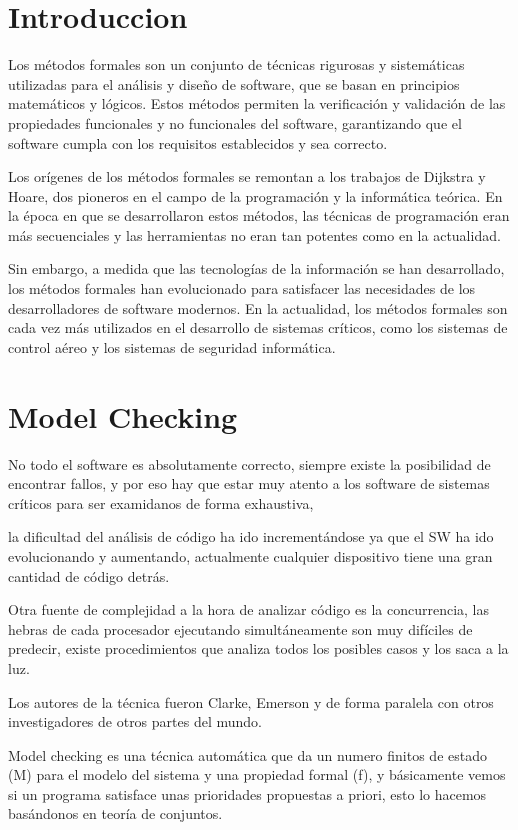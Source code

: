 \section{Introduccion}

Los métodos formales son un conjunto de técnicas rigurosas y sistemáticas utilizadas para el análisis y diseño de software, que se basan en principios matemáticos y lógicos. Estos métodos permiten la verificación y validación de las propiedades funcionales y no funcionales del software, garantizando que el software cumpla con los requisitos establecidos y sea correcto.

Los orígenes de los métodos formales se remontan a los trabajos de Dijkstra y Hoare, dos pioneros en el campo de la programación y la informática teórica. En la época en que se desarrollaron estos métodos, las técnicas de programación eran más secuenciales y las herramientas no eran tan potentes como en la actualidad.

Sin embargo, a medida que las tecnologías de la información se han desarrollado, los métodos formales han evolucionado para satisfacer las necesidades de los desarrolladores de software modernos. En la actualidad, los métodos formales son cada vez más utilizados en el desarrollo de sistemas críticos, como los sistemas de control aéreo y los sistemas de seguridad informática. 

\section{Model Checking}

No todo el software es absolutamente correcto, siempre existe la posibilidad de 
encontrar fallos, y por eso hay que estar muy atento a los software de sistemas 
críticos para ser examidanos de forma exhaustiva,

la dificultad del análisis de código ha ido incrementándose ya que el SW ha ido 
evolucionando y aumentando, actualmente cualquier dispositivo tiene una gran 
cantidad de código detrás.

Otra fuente de complejidad a la hora de analizar código es la concurrencia, 
las hebras de cada procesador ejecutando simultáneamente son muy difíciles de 
predecir, existe procedimientos que analiza todos los posibles casos y los saca a la luz.

Los autores de la técnica fueron Clarke, Emerson y de forma paralela con otros 
investigadores de otros partes del mundo.

Model checking es una técnica automática que da un numero finitos de estado (M) 
para el modelo del sistema y una propiedad formal (f), y básicamente vemos si un 
programa satisface unas prioridades propuestas a priori, esto lo hacemos 
basándonos en teoría de conjuntos. 
\newline

